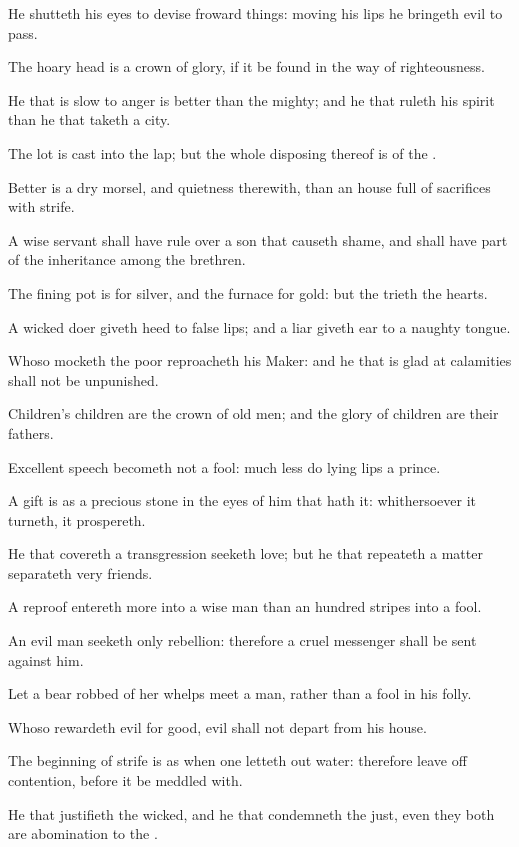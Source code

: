\Verse He shutteth his eyes to devise froward things: moving his lips he bringeth evil to pass.

\Verse The hoary head is a crown of glory, if it be found in the way of righteousness.

\Verse He that is slow to anger is better than the mighty; and he that ruleth his spirit than he that taketh a city.

\Verse The lot is cast into the lap; but the whole disposing thereof is of the \LORD.


\Chapter
\Verse Better is a dry morsel, and quietness therewith, than an house full of sacrifices with strife.

\Verse A wise servant shall have rule over a son that causeth shame, and shall have part of the inheritance among the brethren.

\Verse The fining pot is for silver, and the furnace for gold: but the \LORD trieth the hearts.

\Verse A wicked doer giveth heed to false lips; and a liar giveth ear to a naughty tongue.

\Verse Whoso mocketh the poor reproacheth his Maker: and he that is glad at calamities shall not be unpunished.

\Verse Children's children are the crown of old men; and the glory of children are their fathers.

\Verse Excellent speech becometh not a fool: much less do lying lips a prince.

\Verse A gift is as a precious stone in the eyes of him that hath it: whithersoever it turneth, it prospereth.

\Verse He that covereth a transgression seeketh love; but he that repeateth a matter separateth very friends.

\Verse A reproof entereth more into a wise man than an hundred stripes into a fool.

\Verse An evil man seeketh only rebellion: therefore a cruel messenger shall be sent against him.

\Verse Let a bear robbed of her whelps meet a man, rather than a fool in his folly.

\Verse Whoso rewardeth evil for good, evil shall not depart from his house.

\Verse The beginning of strife is as when one letteth out water: therefore leave off contention, before it be meddled with.

\Verse He that justifieth the wicked, and he that condemneth the just, even they both are abomination to the \LORD.

